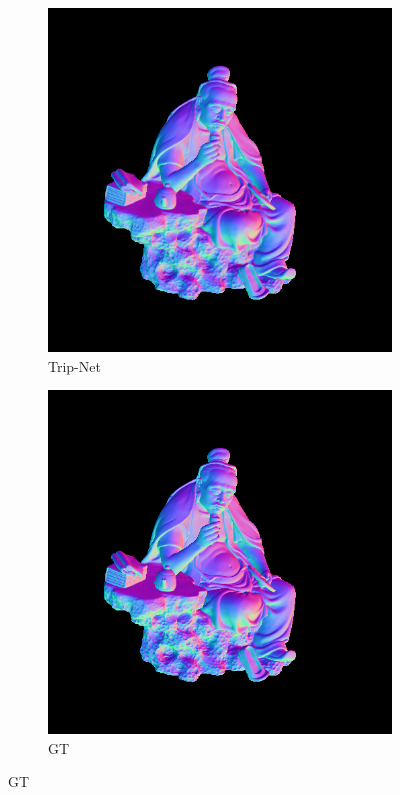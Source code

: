 \begin{figure}[th]
	\centering
	\begin{subfigure}[b]{0.48\linewidth}
		\includegraphics[width=\linewidth]{./Figures/comparison_512/fancy_eval_11_normal_Trip-Net-512.png}
		\caption{Trip-Net}
	\end{subfigure}
	\begin{subfigure}[b]{0.48\linewidth}
		\includegraphics[width=\linewidth]{./Figures/comparison_512/fancy_eval_11_groundtruth.png}
		\caption{GT}
	\end{subfigure}
	

\end{figure}
